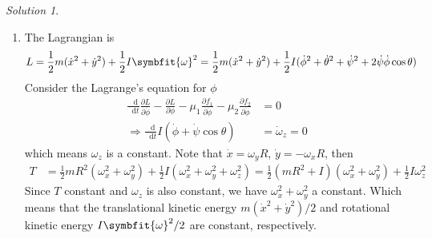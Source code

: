 \documentclass[twoside,11pt]{article}
\renewcommand*\d{\mathop{}\!\mathrm{d}}
\theoremstyle{definition}
\theoremstyle{remark}
\newtheorem*{solution}{Solution}
\begin{document}
\begin{solution}
\begin{enumerate}[label=\arabic*)]
\item The Lagrangian is
\begin{align*}
    L &= \frac{1}{2}m(\dot x^2 + \dot y^2) + \frac{1}{2} I \symbfit{\omega}^2
    = \frac{1}{2}m(\dot x^2 + \dot y^2) + \frac{1}{2}I
    (\dot\phi^2 + \dot\theta^2 + \dot\psi^2 + 2\dot\psi\dot\phi\cos\theta)
\end{align*}
Consider the Lagrange's equation for $\phi$
\begin{align*}
    \frac{\d}{\d t}\frac{\partial L}{\partial\dot\phi} 
    -\frac{\partial L}{\partial\phi}
    -\mu_1\frac{\partial f_1}{\partial\dot\phi}
    -\mu_2\frac{\partial f_2}{\partial\dot\phi} &= 0\\
    \Rightarrow \frac{\d}{\d t} I(\dot\phi + \dot\psi\cos\theta) &= 
    \dot\omega_z = 0
\end{align*}
which means $\omega_z$ is a constant.
Note that $\dot x = \omega_y R$, $\dot y = -\omega_x R$,
then
\begin{align*}
    T &= \frac{1}{2}mR^2 (\omega_x^2 + \omega_y^2) + \frac{1}{2}I(\omega_x^2 + \omega_y^2 + \omega_z^2)
    = \frac{1}{2}(mR^2 + I)(\omega_x^2 + \omega_y^2) + \frac{1}{2}I\omega_z^2
\end{align*}
Since $T$ constant and $\omega_z$ is also constant, we have
$\omega_x^2+\omega_y^2$ a constant.
Which means that the translational kinetic energy $m(\dot x^2 + \dot y^2)/2$
and rotational kinetic energy $I\symbfit{\omega}^2/2$ are constant,
respectively.


\end{enumerate}
\end{solution}
\end{document}
